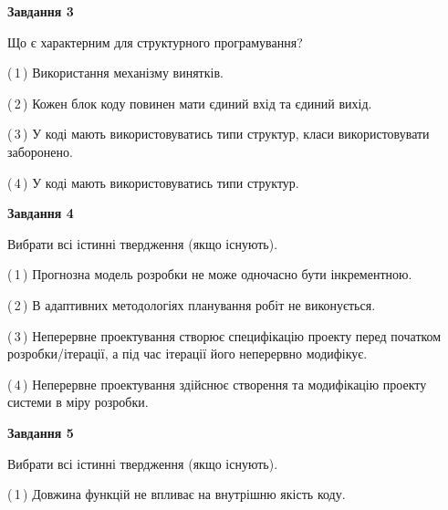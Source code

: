 \documentclass[10pt, ukrainian]{article}
\begin{document}
{\begin {large}
{\begin {center}\textbf{Завдання 3}\end {center}}\par
Що є характерним для структурного програмування?\par
\vspace{2mm}



(\,1\,) Використання механізму винятків. %



(\,2\,) Кожен блок коду повинен мати єдиний вхід та єдиний вихід.%



(\,3\,) У коді мають використовуватись типи структур, класи використовувати заборонено. %



(\,4\,) У коді мають використовуватись типи структур. %


{\begin {center}\textbf{Завдання 4}\end {center}}\par
Вибрати всі істинні твердження (якщо існують).\par
\vspace{2mm}



(\,1\,) Прогнозна модель розробки не може одночасно бути інкрементною. %



(\,2\,) В адаптивних методологіях планування робіт не виконується. %



(\,3\,) Неперервне проектування створює специфікацію проекту перед початком розробки/ітерації, а під час ітерації його неперервно модифікує.%



(\,4\,) Неперервне проектування здійснює створення та модифікацію проекту системи в міру розробки. %


{\begin {center}\textbf{Завдання 5}\end {center}}\par
Вибрати всі істинні твердження (якщо існують).\par
\vspace{2mm}



(\,1\,) Довжина функцій не впливає на внутрішню якість коду. %




\end{large}}
\end{document}
